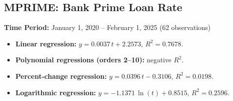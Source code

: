 \documentclass[11pt,a4paper]{article}
\begin{document}
\clearpage
\subsection{MPRIME: Bank Prime Loan Rate}
\textbf{Time Period:} January 1, 2020 – February 1, 2025 (62 observations)

\begin{itemize}
  \item \textbf{Linear regression:} \(y = 0.0037\,t + 2.2573\), \(R^2 = 0.7678\).
  \item \textbf{Polynomial regressions (orders 2–10):} negative \(R^2\).
  \item \textbf{Percent‐change regression:} \(y = 0.0396\,t - 0.3106\), \(R^2 = 0.0198\).
  \item \textbf{Logarithmic regression:} \(y = -1.1371\,\ln(t) + 0.8515\), \(R^2 = 0.2596\).
\end{itemize}
\end{document}
